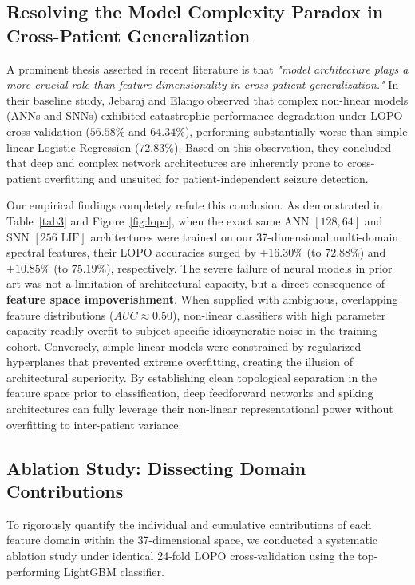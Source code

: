 \documentclass[pdflatex,sn-mathphys-num]{sn-jnl}
\begin{document}
\subsection{Resolving the Model Complexity Paradox in Cross-Patient Generalization}
A prominent thesis asserted in recent literature \cite{jebaraj2026} is that \textit{"model architecture plays a more crucial role than feature dimensionality in cross-patient generalization."} In their baseline study, Jebaraj and Elango observed that complex non-linear models (ANNs and SNNs) exhibited catastrophic performance degradation under LOPO cross-validation ($56.58\%$ and $64.34\%$), performing substantially worse than simple linear Logistic Regression ($72.83\%$). Based on this observation, they concluded that deep and complex network architectures are inherently prone to cross-patient overfitting and unsuited for patient-independent seizure detection.

Our empirical findings completely refute this conclusion. As demonstrated in Table~\ref{tab3} and Figure~\ref{fig:lopo}, when the exact same ANN $[128, 64]$ and SNN $[256\text{ LIF}]$ architectures were trained on our 37-dimensional multi-domain spectral features, their LOPO accuracies surged by $+16.30\%$ (to $72.88\%$) and $+10.85\%$ (to $75.19\%$), respectively. The severe failure of neural models in prior art was not a limitation of architectural capacity, but a direct consequence of \textbf{feature space impoverishment}. When supplied with ambiguous, overlapping feature distributions ($AUC \approx 0.50$), non-linear classifiers with high parameter capacity readily overfit to subject-specific idiosyncratic noise in the training cohort. Conversely, simple linear models were constrained by regularized hyperplanes that prevented extreme overfitting, creating the illusion of architectural superiority. By establishing clean topological separation in the feature space prior to classification, deep feedforward networks and spiking architectures can fully leverage their non-linear representational power without overfitting to inter-patient variance.

\subsection{Ablation Study: Dissecting Domain Contributions}
To rigorously quantify the individual and cumulative contributions of each feature domain within the 37-dimensional space, we conducted a systematic ablation study under identical 24-fold LOPO cross-validation using the top-performing LightGBM classifier.
\end{document}
